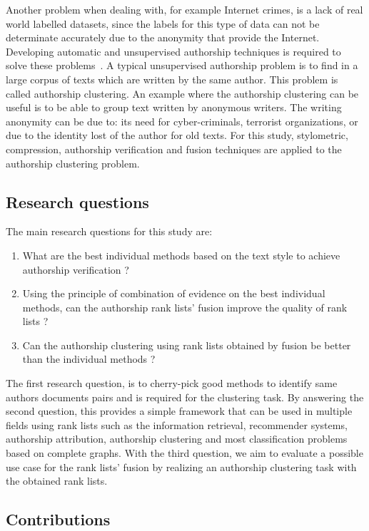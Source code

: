 Another problem when dealing with, for example Internet crimes, is a lack of real world labelled datasets, since the labels for this type of data can not be determinate accurately due to the anonymity that provide the Internet.
Developing automatic and unsupervised authorship techniques is required to solve these problems~\cite{automated_unsupervised}.
A typical unsupervised authorship problem is to find in a large corpus of texts which are written by the same author.
This problem is called authorship clustering.
An example where the authorship clustering can be useful is to be able to group text written by anonymous writers.
The writing anonymity can be due to: its need for cyber-criminals, terrorist organizations, or due to the identity lost of the author for old texts.
For this study, stylometric, compression, authorship verification and fusion techniques are applied to the authorship clustering problem.

\subsection{Research questions}

The main research questions for this study are:

\begin{enumerate}
  \item
  What are the best individual methods based on the text style to achieve authorship verification ?
  \item
  Using the principle of combination of evidence on the best individual methods, can the authorship rank lists' fusion improve the quality of rank lists ?
  \item
  Can the authorship clustering using rank lists obtained by fusion be better than the individual methods ?
\end{enumerate}

The first research question, is to cherry-pick good methods to identify same authors documents pairs and is required for the clustering task.
By answering the second question, this provides a simple framework that can be used in multiple fields using rank lists such as the information retrieval, recommender systems, authorship attribution, authorship clustering and most classification problems based on complete graphs.
With the third question, we aim to evaluate a possible use case for the rank lists' fusion by realizing an authorship clustering task with the obtained rank lists.

\subsection{Contributions}

